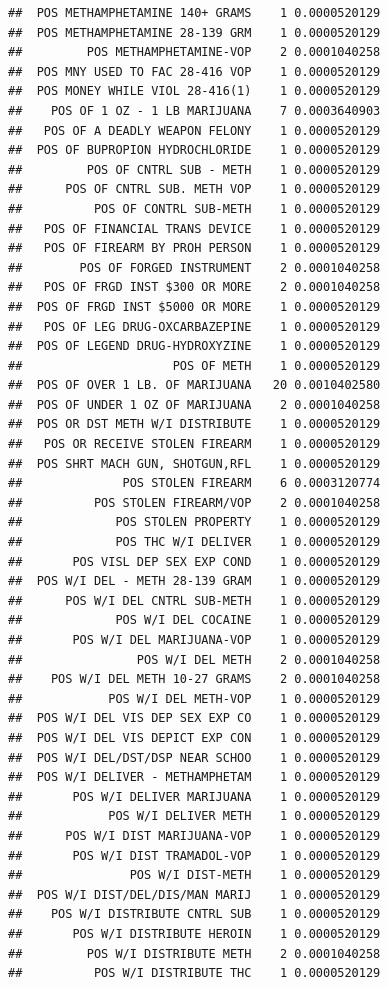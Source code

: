 \documentclass[]{book}
\begin{document}
\begin{verbatim}
##  POS METHAMPHETAMINE 140+ GRAMS    1 0.0000520129
##  POS METHAMPHETAMINE 28-139 GRM    1 0.0000520129
##         POS METHAMPHETAMINE-VOP    2 0.0001040258
##  POS MNY USED TO FAC 28-416 VOP    1 0.0000520129
##  POS MONEY WHILE VIOL 28-416(1)    1 0.0000520129
##    POS OF 1 OZ - 1 LB MARIJUANA    7 0.0003640903
##   POS OF A DEADLY WEAPON FELONY    1 0.0000520129
##  POS OF BUPROPION HYDROCHLORIDE    1 0.0000520129
##         POS OF CNTRL SUB - METH    1 0.0000520129
##      POS OF CNTRL SUB. METH VOP    1 0.0000520129
##          POS OF CONTRL SUB-METH    1 0.0000520129
##   POS OF FINANCIAL TRANS DEVICE    1 0.0000520129
##   POS OF FIREARM BY PROH PERSON    1 0.0000520129
##        POS OF FORGED INSTRUMENT    2 0.0001040258
##   POS OF FRGD INST $300 OR MORE    2 0.0001040258
##  POS OF FRGD INST $5000 OR MORE    1 0.0000520129
##   POS OF LEG DRUG-OXCARBAZEPINE    1 0.0000520129
##  POS OF LEGEND DRUG-HYDROXYZINE    1 0.0000520129
##                     POS OF METH    1 0.0000520129
##  POS OF OVER 1 LB. OF MARIJUANA   20 0.0010402580
##  POS OF UNDER 1 OZ OF MARIJUANA    2 0.0001040258
##  POS OR DST METH W/I DISTRIBUTE    1 0.0000520129
##   POS OR RECEIVE STOLEN FIREARM    1 0.0000520129
##  POS SHRT MACH GUN, SHOTGUN,RFL    1 0.0000520129
##              POS STOLEN FIREARM    6 0.0003120774
##          POS STOLEN FIREARM/VOP    2 0.0001040258
##             POS STOLEN PROPERTY    1 0.0000520129
##             POS THC W/I DELIVER    1 0.0000520129
##       POS VISL DEP SEX EXP COND    1 0.0000520129
##  POS W/I DEL - METH 28-139 GRAM    1 0.0000520129
##      POS W/I DEL CNTRL SUB-METH    1 0.0000520129
##             POS W/I DEL COCAINE    1 0.0000520129
##       POS W/I DEL MARIJUANA-VOP    1 0.0000520129
##                POS W/I DEL METH    2 0.0001040258
##    POS W/I DEL METH 10-27 GRAMS    2 0.0001040258
##            POS W/I DEL METH-VOP    1 0.0000520129
##  POS W/I DEL VIS DEP SEX EXP CO    1 0.0000520129
##  POS W/I DEL VIS DEPICT EXP CON    1 0.0000520129
##  POS W/I DEL/DST/DSP NEAR SCHOO    1 0.0000520129
##  POS W/I DELIVER - METHAMPHETAM    1 0.0000520129
##       POS W/I DELIVER MARIJUANA    1 0.0000520129
##            POS W/I DELIVER METH    1 0.0000520129
##      POS W/I DIST MARIJUANA-VOP    1 0.0000520129
##       POS W/I DIST TRAMADOL-VOP    1 0.0000520129
##               POS W/I DIST-METH    1 0.0000520129
##  POS W/I DIST/DEL/DIS/MAN MARIJ    1 0.0000520129
##    POS W/I DISTRIBUTE CNTRL SUB    1 0.0000520129
##       POS W/I DISTRIBUTE HEROIN    1 0.0000520129
##         POS W/I DISTRIBUTE METH    2 0.0001040258
##          POS W/I DISTRIBUTE THC    1 0.0000520129

\end{verbatim}
\end{document}
